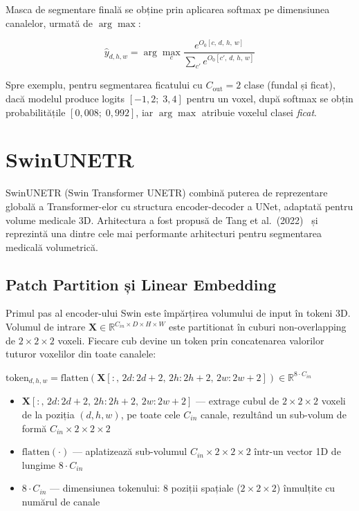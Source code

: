 \documentclass[12pt, a4paper]{report}
\newcommand{\formula}[1]{%
    \begin{center}
        \colorbox{codebackground}{%
            \parbox{0.88\textwidth}{\centering\vspace{4pt}$#1$\vspace{4pt}}%
        }
    \end{center}
}
\begin{document}
Masca de segmentare finală se obține prin aplicarea softmax
pe dimensiunea canalelor, urmată de $\arg\max$:

\begin{equation}
    \hat{y}_{d,h,w}
    = \arg\max_{c}
      \frac{e^{O_0[c,\,d,\,h,\,w]}}
           {\displaystyle\sum_{c'}
            e^{O_0[c',\,d,\,h,\,w]}}
\end{equation}

Spre exemplu, pentru segmentarea ficatului cu
$C_{\text{out}}=2$ clase (fundal și ficat), dacă modelul
produce logits $[-1{,}2;\; 3{,}4]$ pentru un voxel, după
softmax se obțin probabilitățile $[0{,}008;\; 0{,}992]$,
iar $\arg\max$ atribuie voxelul clasei \textit{ficat}.






\section{SwinUNETR}

SwinUNETR (Swin Transformer UNETR) combină puterea de reprezentare globală a
Transformer-elor cu structura encoder-decoder a UNet, adaptată pentru volume
medicale 3D. Arhitectura a fost propusă de Tang et al.\ (2022)~\cite{tang2022swinunetr} și reprezintă
una dintre cele mai performante arhitecturi pentru segmentarea medicală volumetrică.


\subsection{Patch Partition și Linear Embedding}

Primul pas al encoder-ului Swin este împărțirea volumului de input
în tokeni 3D. Volumul de intrare $\mathbf{X} \in \mathbb{R}^{C_{in}
\times D \times H \times W}$ este partitionat în cuburi non-overlapping
de $2\times2\times2$ voxeli. Fiecare cub devine un token prin
concatenarea valorilor tuturor voxelilor din toate canalele:

\formula{
    \text{token}_{d,h,w} = \text{flatten}\!\left(\mathbf{X}[:,\,
    2d:2d+2,\, 2h:2h+2,\, 2w:2w+2]\right)
    \in \mathbb{R}^{8 \cdot C_{in}}
}

\begin{itemize}
    \item $\mathbf{X}[:,\, 2d:2d+2,\, 2h:2h+2,\, 2w:2w+2]$ ---
    extrage cubul de $2\times2\times2$ voxeli de la poziția $(d,h,w)$,
    pe toate cele $C_{in}$ canale, rezultând un sub-volum de formă
    $C_{in} \times 2 \times 2 \times 2$
    \item $\text{flatten}(\cdot)$ --- aplatizează sub-volumul
    $C_{in} \times 2 \times 2 \times 2$ într-un vector 1D de lungime
    $8 \cdot C_{in}$
    \item $8 \cdot C_{in}$ --- dimensiunea tokenului: 8 poziții
    spațiale ($2\times2\times2$) înmulțite cu numărul de canale
\end{itemize}
\end{document}

